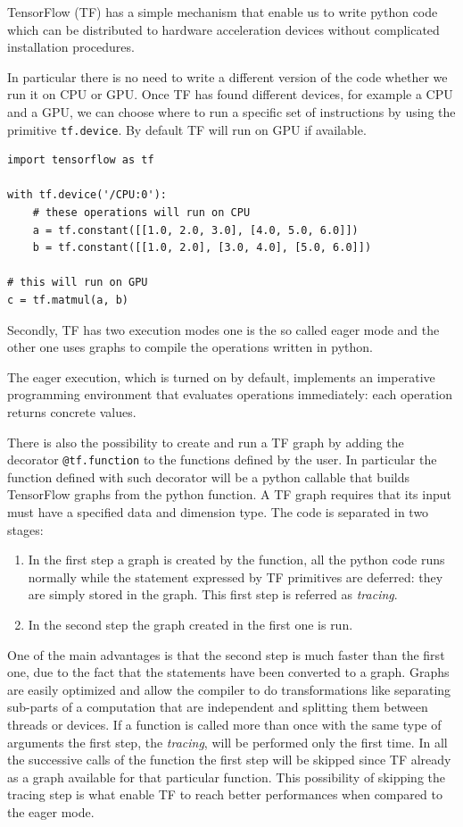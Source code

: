 \documentclass[../main/main.tex]{subfiles}
\begin{document}
TensorFlow (TF) has a simple mechanism that enable us to write python code which can be distributed to hardware 
 acceleration devices without complicated installation procedures.
 
 In particular there is no need to write a different version of the code whether we run it on CPU or GPU. Once TF has found different devices, for example a CPU and a GPU, we can choose where to run a specific set of instructions by using the primitive \texttt{tf.device}.
 By default TF will run on GPU if available.
 
\begin{verbatim}
import tensorflow as tf

with tf.device('/CPU:0'):
	# these operations will run on CPU
	a = tf.constant([[1.0, 2.0, 3.0], [4.0, 5.0, 6.0]])
	b = tf.constant([[1.0, 2.0], [3.0, 4.0], [5.0, 6.0]])
		
# this will run on GPU	
c = tf.matmul(a, b)
\end{verbatim}

Secondly, TF has two execution modes one is the so called eager mode and the other one uses graphs to compile the operations written in python.

The eager execution, which is turned on by default, implements an imperative programming environment that evaluates operations immediately: each operation returns concrete values. 

There is also the possibility to create and run a  TF graph by adding the decorator \texttt{@tf.function} to the functions defined by the user. In particular the function defined with such decorator will be a python callable that builds TensorFlow graphs from the python function.
A TF graph requires that its input must have a specified data and dimension type. The code is separated in two stages:
\begin{enumerate}
	\item In the first step a graph is created by the function, all the python code runs normally while the statement expressed by TF primitives are deferred: they are simply stored in the graph. This first step is referred as \emph{tracing}.
	\item In the second step the graph created in the first one is run.
\end{enumerate}

One of the main advantages is that the second step is much faster than the first one, due to the fact that the statements have been converted to a graph. 
Graphs are easily optimized and allow the compiler to do transformations like separating sub-parts of a computation that are independent and splitting them between threads or devices.
If a function is called more than once with the same type of arguments the first step, the \emph{tracing}, will be performed only the first time. In all the successive calls of the function the first step will be skipped since TF already as a graph available for that particular function.
This possibility of skipping the tracing step is what enable TF to reach better performances when compared to the eager mode. 
\end{document}
